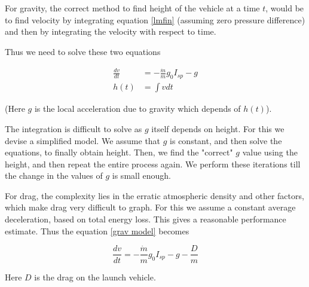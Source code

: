 \documentclass{article}
\theoremstyle{definition}
\begin{document}
For gravity, the correct method to find height of the vehicle at a time $t$, would be to find velocity by integrating equation \ref{lmfin} (assuming zero pressure difference) and then by integrating the velocity with respect to time.

Thus we need to solve these two equations

\begin{equation} \label{grav model}
\begin{split}
    \frac{dv}{dt} & =  -\frac{\Dot{m}}{m} g_0 I_{sp} - g   \\
    h(t) & = \int v dt
\end{split}
\end{equation}

(Here $g$ is the local acceleration due to gravity which depends of $h(t)$).

The integration is difficult to solve as $g$ itself depends on height. For this we devise a simplified model.
We assume that $g$ is constant, and then solve the equations, to finally obtain height. 
Then, we find the "correct" $g$ value using the height, and then repeat the entire process again.
We perform these iterations till the change in the values of $g$ is small enough.

For drag, the complexity lies in the erratic atmospheric density and other factors, which make drag very difficult to graph.
For this we assume a constant average deceleration, based on total energy loss. This gives a reasonable performance estimate. Thus the equation \ref{grav model} becomes 

\begin{equation}
    \frac{dv}{dt} =  -\frac{\Dot{m}}{m} g_0 I_{sp} - g - \frac{D}{m}
\end{equation}

Here $D$ is the drag on the launch vehicle.
\end{document}

